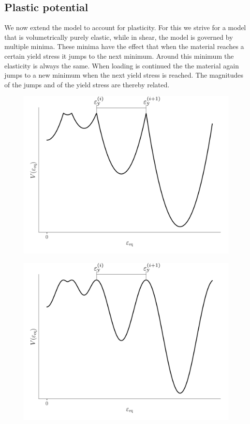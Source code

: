 \documentclass[times,namecite]{goose-article}
\begin{document}
\subsection{Plastic potential}

We now extend the model to account for plasticity. For this we strive for a model that is volumetrically purely elastic, while in shear, the model is governed by multiple minima. These minima have the effect that when the material reaches a certain yield stress it jumps to the next minimum. Around this minimum the elasticity is always the same. When loading is continued the the material again jumps to a new minimum when the next yield stress is reached. The magnitudes of the jumps and of the yield stress are thereby related.

\begin{figure}[htp]
  \centering
  \captionsetup[subfigure]{justification=centering}
  \begin{minipage}[t]{.49\textwidth}
    \centering
    \includegraphics[width=1.\textwidth]{figures/potential_V-plas}
    \label{fig:V-plas}
  \end{minipage}
  \hfill
  \begin{minipage}[t]{.49\textwidth}
    \centering
    \includegraphics[width=1.\textwidth]{figures/potential_V-plas-smooth}

\end{minipage}
\end{figure}
\end{document}
